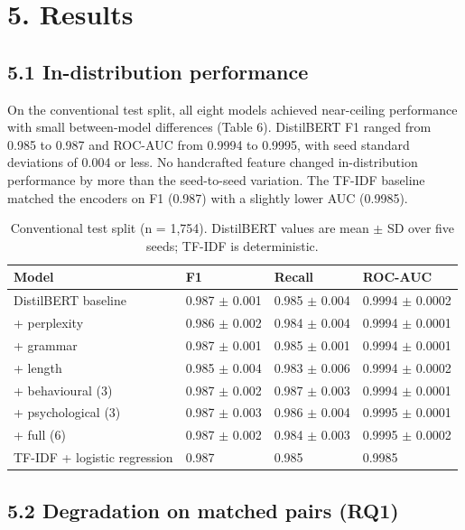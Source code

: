 \documentclass[11pt,letterpaper]{article}
\begin{document}
\section{5. Results}

\subsection{5.1 In-distribution performance}

On the conventional test split, all eight models achieved near-ceiling performance with small between-model differences (Table 6). DistilBERT F1 ranged from 0.985 to 0.987 and ROC-AUC from 0.9994 to 0.9995, with seed standard deviations of 0.004 or less. No handcrafted feature changed in-distribution performance by more than the seed-to-seed variation. The TF-IDF baseline matched the encoders on F1 (0.987) with a slightly lower AUC (0.9985).

\begin{table}[!htbp]
\centering
\footnotesize
\caption{Conventional test split (n = 1,754). DistilBERT values are mean $\pm$ SD over five seeds; TF-IDF is deterministic.}
\begin{tabularx}{\linewidth}{Ylll}
\toprule
\textbf{Model} & \textbf{F1} & \textbf{Recall} & \textbf{ROC-AUC} \\
\midrule
DistilBERT baseline & 0.987 $\pm$ 0.001 & 0.985 $\pm$ 0.004 & 0.9994 $\pm$ 0.0002 \\
+ perplexity & 0.986 $\pm$ 0.002 & 0.984 $\pm$ 0.004 & 0.9994 $\pm$ 0.0001 \\
+ grammar & 0.987 $\pm$ 0.001 & 0.985 $\pm$ 0.001 & 0.9994 $\pm$ 0.0001 \\
+ length & 0.985 $\pm$ 0.004 & 0.983 $\pm$ 0.006 & 0.9994 $\pm$ 0.0002 \\
+ behavioural (3) & 0.987 $\pm$ 0.002 & 0.987 $\pm$ 0.003 & 0.9994 $\pm$ 0.0001 \\
+ psychological (3) & 0.987 $\pm$ 0.003 & 0.986 $\pm$ 0.004 & 0.9995 $\pm$ 0.0001 \\
+ full (6) & 0.987 $\pm$ 0.002 & 0.984 $\pm$ 0.003 & 0.9995 $\pm$ 0.0002 \\
TF-IDF + logistic regression & 0.987 & 0.985 & 0.9985 \\
\bottomrule
\end{tabularx}
\end{table}

\subsection{5.2 Degradation on matched pairs (RQ1)}
\end{document}
